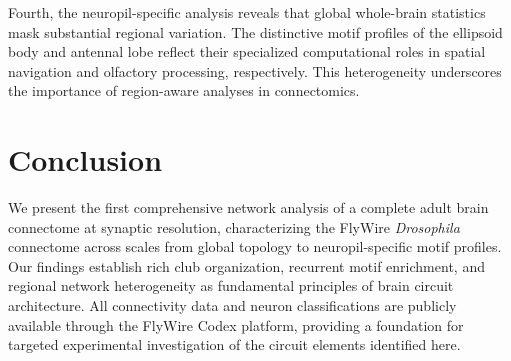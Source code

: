\documentclass[11pt]{article}
\begin{document}
Fourth, the neuropil-specific analysis reveals that global whole-brain statistics mask substantial regional variation.  The distinctive motif profiles of the ellipsoid body and antennal lobe reflect their specialized computational roles in spatial navigation and olfactory processing, respectively.  This heterogeneity underscores the importance of region-aware analyses in connectomics.

\section{Conclusion}

We present the first comprehensive network analysis of a complete adult brain connectome at synaptic resolution, characterizing the FlyWire \emph{Drosophila} connectome across scales from global topology to neuropil-specific motif profiles.  Our findings establish rich club organization, recurrent motif enrichment, and regional network heterogeneity as fundamental principles of brain circuit architecture.  All connectivity data and neuron classifications are publicly available through the FlyWire Codex platform, providing a foundation for targeted experimental investigation of the circuit elements identified here.



\end{document}
